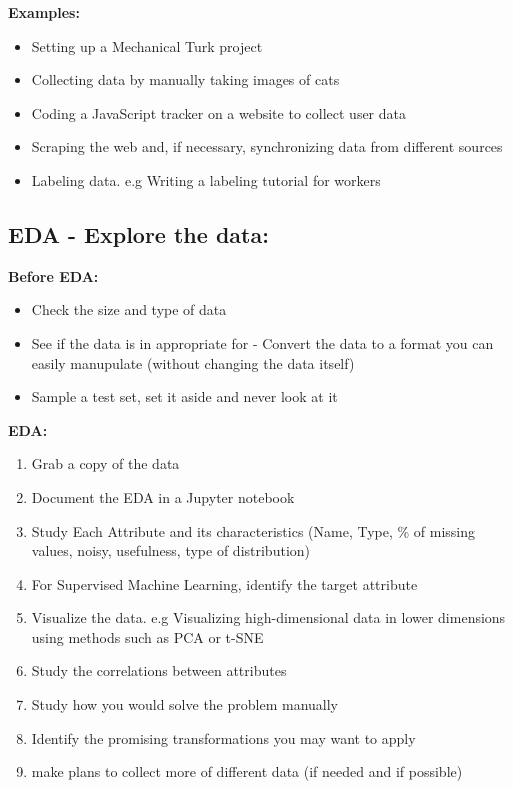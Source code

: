 \documentclass[openany]{book}
\begin{document}
\textbf{Examples: }

\begin{itemize}
    \item Setting up a Mechanical Turk project 
    \item Collecting data by manually taking images of cats 
    \item Coding a JavaScript tracker on a website to collect user data 
    \item Scraping the web and, if necessary, synchronizing data from different sources
    \item  Labeling data. e.g \- Writing a labeling tutorial for workers
\end{itemize} 



\subsection{EDA - Explore the data:}

\textbf{Before EDA:}

\begin{itemize}
    \item Check the size and type of data  
    \item See if the data is in appropriate for  - Convert the data to a format you can easily manupulate (without changing the data itself)
    \item  Sample a test set, set it aside and never look at it
\end{itemize}



\textbf{EDA:}


\begin{enumerate}
    \item Grab a copy of the data 
    \item  Document the EDA in a Jupyter notebook
    \item  Study Each Attribute and its characteristics (Name, Type, \% of missing values, noisy, usefulness, type of distribution)
    \item For Supervised Machine Learning, identify the target attribute 
    \item  Visualize the data. e.g Visualizing high-dimensional data in lower dimensions using methods such as PCA or t-SNE
    \item  Study the correlations between attributes 
    \item Study how you would solve the problem manually
    \item  Identify the promising transformations you may want to apply
    \item make plans to collect more of different data (if needed and if possible)
\end{enumerate}
\end{document}

